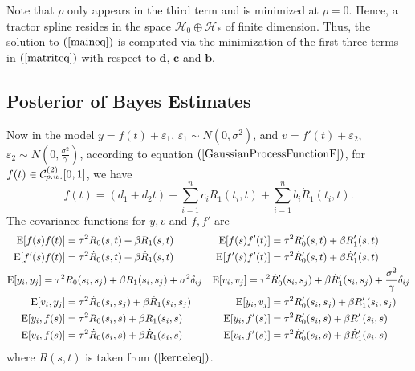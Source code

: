 Note that $\rho$ only appears in the third term and is minimized at $\rho=0$. Hence, a tractor spline resides in the space $\mathcal{H}_0\oplus \mathcal{H}_*$ of finite dimension. Thus, the solution to $(\ref{maineq})$ is computed via the minimization of the first three terms in $(\ref{matriteq})$ with respect to $\mathbf{d}$, $\mathbf{c}$ and $\mathbf{b}$.



\subsection{Posterior of Bayes Estimates}


Now in the model $y=f(t)+\varepsilon_1$, $\varepsilon_1 \sim N(0,\sigma^2)$, and $v=f '(t)+\varepsilon_2$, $\varepsilon_2\sim N\left(0, \frac{\sigma^2}{\gamma}\right)$, according to equation $(\ref{GaussianProcessFunctionF})$, for $f(t) \in \mathcal{C}_{\footnotesize p.w.}^{(2)}[0,1]$, we have 
\begin{equation}
f(t)=(d_1+d_2t)+\sum_{i=1}^{n}c_iR_1(t_i,t)+\sum_{i=1}^{n}b_i\dot{R}_1(t_i,t).
\end{equation}
The covariance functions for $y,v$ and $f , f '$ are \small
\begin{align*}
\mathrm{E}\lbrack f(s)f (t)\rbrack &=\tau^2R_0(s,t)+\beta R_1(s,t) & \mathrm{E} \lbrack f(s)f '(t)\rbrack&=\tau^2R_0'(s,t)+\beta R_1'(s,t) \\
\mathrm{E}\lbrack f '(s)f (t)\rbrack&=\tau^2\dot{R}_0(s,t)+\beta\dot{R}_1(s,t) & \mathrm{E}\lbrack f '(s)f '(t)\rbrack&=\tau^2\dot{R}'_0(s,t)+\beta\dot{R}'_1(s,t) \\
\footnotesize \mathrm{E}\lbrack y_i,y_j\rbrack=\tau^2 & R_0(s_i,s_j)+\beta R_1(s_i,s_j)+\sigma^2\delta_{ij}   & 
\mathrm{E} \lbrack v_i,v_j\rbrack=\tau^2&\dot{R}'_0(s_i,s_j)+\beta\dot{R}'_1(s_i,s_j) +\frac{\sigma^2}{\gamma}\delta_{ij} \\ 
\normalsize
\mathrm{E}\lbrack v_i,y_j\rbrack&=\tau^2\dot{R}_0(s_i,s_j)+\beta \dot{R}_1(s_i,s_j) &
\mathrm{E}\lbrack y_i,v_j\rbrack&=\tau^2R_0'(s_i,s_j)+\beta R_1'(s_i,s_j)\\
\mathrm{E}\lbrack y_i,f(s)\rbrack&=\tau^2 R_0(s_i,s)+\beta R_1(s_i,s)  & \mathrm{E}\lbrack y_i,f '(s)\rbrack&=\tau^2 R'_0(s_i,s)+\beta R'_1(s_i,s)  \\
\mathrm{E}\lbrack v_i,f(s)\rbrack&=\tau^2 \dot{R}_0(s_i,s)+\beta \dot{R}_1(s_i,s) & \mathrm{E}\lbrack v_i,f '(s)\rbrack&=\tau^2\dot{R}'_0(s_i,s)+\beta \dot{R}'_1(s_i,s)
\end{align*}
\normalsize where $R(s,t)$ is taken from $(\ref{kerneleq})$. 


